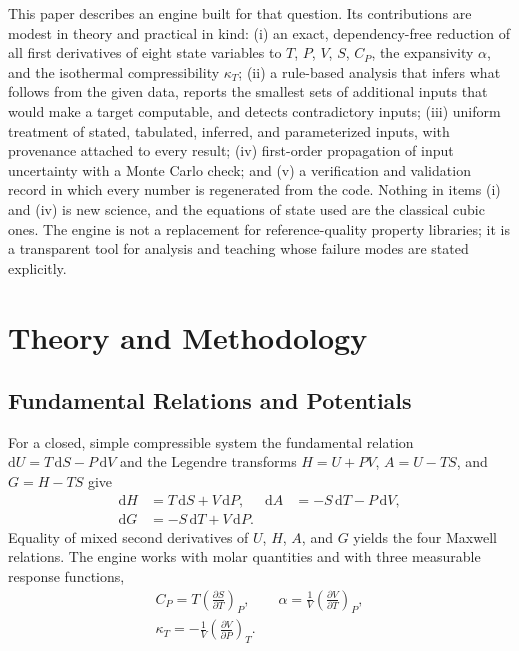 \documentclass[journal=iecred,manuscript=article,layout=twocolumn]{achemso}
\newcommand{\pd}[3]{\left(\frac{\partial #1}{\partial #2}\right)_{\!#3}}
\begin{document}
This paper describes an engine built for that question. Its contributions are
modest in theory and practical in kind: (i) an exact, dependency-free reduction
of all \NDerivTotal{} first derivatives of eight state variables to $T$, $P$,
$V$, $S$, $C_P$, the expansivity $\alpha$, and the isothermal compressibility
$\kappa_T$; (ii) a rule-based analysis that infers what follows from the given
data, reports the smallest sets of additional inputs that would make a target
computable, and detects contradictory inputs; (iii) uniform treatment of stated,
tabulated, inferred, and parameterized inputs, with provenance attached to every
result; (iv) first-order propagation of input uncertainty with a Monte Carlo
check; and (v) a verification and validation record in which every number is
regenerated from the code. Nothing in items (i) and (iv) is new science, and
the equations of state used are the classical cubic
ones.\cite{vanderWaals1873,Redlich1949,Soave1972,Peng1976} The engine is not a
replacement for reference-quality property libraries; it is a transparent tool
for analysis and teaching whose failure modes are stated explicitly.

\section{Theory and Methodology}

\subsection{Fundamental Relations and Potentials}

For a closed, simple compressible system the fundamental relation
$\mathrm{d}U = T\,\mathrm{d}S - P\,\mathrm{d}V$ and the Legendre transforms
$H = U + PV$, $A = U - TS$, and $G = H - TS$ give\cite{Callen1985}
\begin{equation}
\begin{aligned}
\mathrm{d}H &= T\,\mathrm{d}S + V\,\mathrm{d}P, &
\mathrm{d}A &= -S\,\mathrm{d}T - P\,\mathrm{d}V,\\
\mathrm{d}G &= -S\,\mathrm{d}T + V\,\mathrm{d}P. &&
\end{aligned}
\label{eq:potentials}
\end{equation}
Equality of mixed second derivatives of $U$, $H$, $A$, and $G$ yields the four
Maxwell relations. The engine works with molar quantities and with three
measurable response functions,
\begin{equation}
\begin{gathered}
C_P = T\pd{S}{T}{P},\qquad
\alpha = \frac{1}{V}\pd{V}{T}{P},\\
\kappa_T = -\frac{1}{V}\pd{V}{P}{T}.
\end{gathered}
\label{eq:response}
\end{equation}
\end{document}
